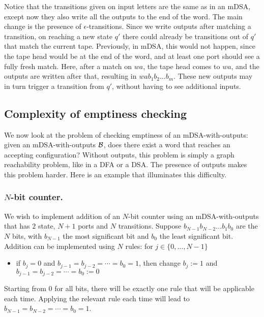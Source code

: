 Notice that the transitions given on input letters are the same as in an mDSA, except now they also write all the outputs to the end of the word. The main change is the presence of $\epsilon$-transitions. Since we write outputs after matching a transition, on reaching a new state $q'$ there could already be transitions out of $q'$ that match the current tape. Previously, in mDSA, this would not happen, since the tape head would be at the end of the word, and at least one port should see a fully fresh match. Here, after a match on $wa$, the tape head comes to $wa$, and the outputs are written after that, resulting in $wa b_1 b_2 \dots b_m$. These new outputs may in turn trigger a transition from $q'$, without having to see additional inputs.

\subsection{Complexity of emptiness checking}

We now look at the problem of checking emptiness of an mDSA-with-outputs: given an mDSA-with-outputs $\mathcal{B}$, does there exist a word that reaches an accepting configuration? Without outputs, this problem is simply a graph reachability problem, like in a DFA or a DSA. The presence of outputs makes this problem harder. Here is an example that illuminates this difficulty.

\subsubsection*{$N$-bit counter.} We wish to implement addition of an $N$-bit counter using an mDSA-with-outputs that has $2$ state, $N+1$ ports and $N$ transitions. Suppose $b_{N-1} b_{N-2} \dots b_1 b_0$ are the $N$ bits, with $b_{N-1}$ the most significant bit and $b_0$ the least significant bit. Addition can be implemented using $N$ rules: for $j \in \{0, \dots, N-1\}$
\begin{itemize}
\item if $b_j = 0$ and $b_{j-1} = b_{j-2} = \cdots = b_0 = 1$, then change $b_j:= 1$ and $b_{j-1} = b_{j-2} = \cdots = b_0 := 0$
\end{itemize}
Starting from $0$ for all bits, there will be exactly one rule that will be applicable each time. Applying the relevant rule each time will lead to $b_{N-1} = b_{N-2} = \cdots = b_0 = 1$.

